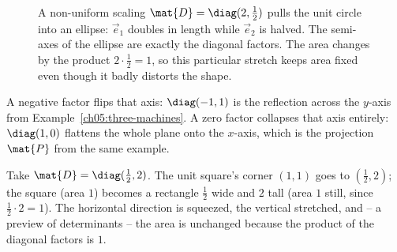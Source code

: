 \begin{figure}[H]
\centering
{}
\caption{A non-uniform scaling $\mat{D}=\diag(2,\tfrac12)$ pulls the unit circle
into an ellipse: $\vec{e}_1$ doubles in length while $\vec{e}_2$ is halved. The
semi-axes of the ellipse are exactly the diagonal factors. The area changes by
the product $2\cdot\tfrac12 = 1$, so this particular stretch keeps area fixed even
though it badly distorts the shape.}
\label{ch05:fig-scaling}
\end{figure}

A negative factor flips that axis: $\diag(-1,1)$ is the reflection across the
$y$-axis from Example~\ref{ch05:three-machines}. A zero factor collapses that axis
entirely: $\diag(1,0)$ flattens the whole plane onto the $x$-axis, which is the
projection $\mat{P}$ from the same example.

\begin{example}
\label{ch05:scaling-ex}
Take $\mat{D} = \diag(\tfrac12, 2)$. The unit square's corner $(1,1)$ goes to
$(\tfrac12, 2)$; the square (area $1$) becomes a rectangle $\tfrac12$ wide and $2$
tall (area $1$ still, since $\tfrac12 \cdot 2 = 1$). The horizontal direction is
squeezed, the vertical stretched, and -- a preview of determinants -- the area is
unchanged because the product of the diagonal factors is $1$.
\end{example}

